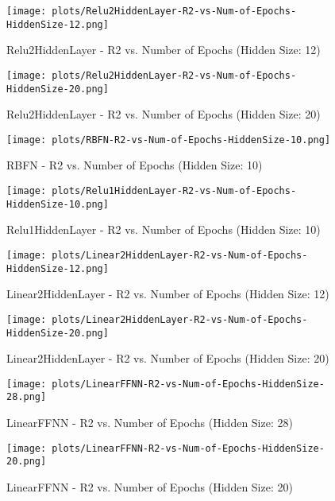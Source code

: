 \begin{figure}[H]
    \centering
    \texttt{[image: plots/Relu2HiddenLayer-R2-vs-Num-of-Epochs-HiddenSize-12.png]}
    \caption{Relu2HiddenLayer - R2 vs. Number of Epochs (Hidden Size: 12)}
\end{figure}

\begin{figure}[H]
    \centering
    \texttt{[image: plots/Relu2HiddenLayer-R2-vs-Num-of-Epochs-HiddenSize-20.png]}
    \caption{Relu2HiddenLayer - R2 vs. Number of Epochs (Hidden Size: 20)}
\end{figure}

\begin{figure}[H]
    \centering
    \texttt{[image: plots/RBFN-R2-vs-Num-of-Epochs-HiddenSize-10.png]}
    \caption{RBFN - R2 vs. Number of Epochs (Hidden Size: 10)}
\end{figure}

\begin{figure}[H]
    \centering
    \texttt{[image: plots/Relu1HiddenLayer-R2-vs-Num-of-Epochs-HiddenSize-10.png]}
    \caption{Relu1HiddenLayer - R2 vs. Number of Epochs (Hidden Size: 10)}
\end{figure}

\begin{figure}[H]
    \centering
    \texttt{[image: plots/Linear2HiddenLayer-R2-vs-Num-of-Epochs-HiddenSize-12.png]}
    \caption{Linear2HiddenLayer - R2 vs. Number of Epochs (Hidden Size: 12)}
\end{figure}

\begin{figure}[H]
    \centering
    \texttt{[image: plots/Linear2HiddenLayer-R2-vs-Num-of-Epochs-HiddenSize-20.png]}
    \caption{Linear2HiddenLayer - R2 vs. Number of Epochs (Hidden Size: 20)}
\end{figure}

\begin{figure}[H]
    \centering
    \texttt{[image: plots/LinearFFNN-R2-vs-Num-of-Epochs-HiddenSize-28.png]}
    \caption{LinearFFNN - R2 vs. Number of Epochs (Hidden Size: 28)}
\end{figure}

\begin{figure}[H]
    \centering
    \texttt{[image: plots/LinearFFNN-R2-vs-Num-of-Epochs-HiddenSize-20.png]}
    \caption{LinearFFNN - R2 vs. Number of Epochs (Hidden Size: 20)}
\end{figure}

